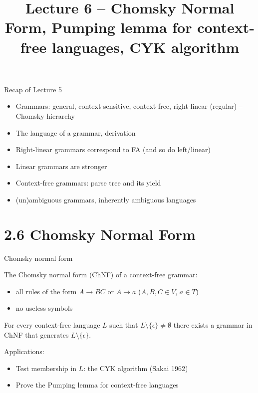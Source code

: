 \documentclass[handout]{beamer}
\title{Lecture 6 -- Chomsky Normal Form, Pumping lemma for context-free languages, CYK algorithm}
\begin{document}
\frame{\titlepage}


\begin{frame}{Recap of Lecture 5}
	
	\begin{itemize}
		\item Grammars: general, context-sensitive, context-free, right-linear (regular) -- Chomsky hierarchy
		\item The language of a grammar, derivation
		\item Right-linear grammars correspond to FA (and so do left/linear)
		\item Linear grammars are stronger
		\item Context-free grammars: parse tree and its yield
		\item (un)ambiguous grammars, inherently ambiguous languages
	\end{itemize}

\end{frame}


\section{2.6 Chomsky Normal Form}


\begin{frame}{Chomsky normal form}
	
	The \alert{Chomsky normal form (ChNF)} of a context-free grammar:
	
	\begin{itemize}
		\item all rules of the form \alert{$A\to BC$} or  \alert{$A\to a$} ($A,B,C\in V$, $a\in T$)
		\item no \alert{useless} symbols
	\end{itemize}

	\begin{theorem}
		For every context-free language $L$ such that $L\setminus \{\epsilon\}\neq \emptyset$ there exists a grammar in ChNF that generates $L\setminus \{\epsilon\}$.
	\end{theorem}
	
	Applications:
	
	\begin{itemize}
		\item Test membership in $L$: the \alert{CYK algorithm} (Sakai 1962) 
		\item Prove the \alert{Pumping lemma for context-free languages}
	\end{itemize}

\end{frame}
\end{document}
